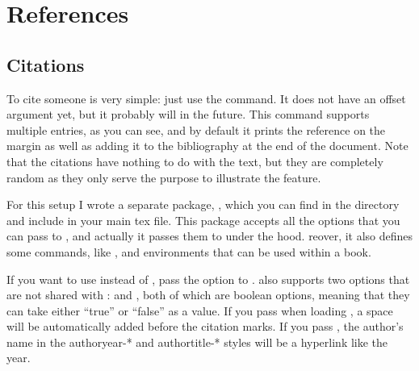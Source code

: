 \chapter{References}

\section{Citations}

To cite someone  is very simple: just 
use the  command. It does 
not have an offset argument yet, but it probably will in the future. 
This command supports multiple entries, as you can see, and by default 
it prints the reference on the margin as well as adding it to the 
bibliography at the end of the document. Note that the citations have 
nothing to do with the text, but they are completely 
random as they only serve the purpose to illustrate the feature.

For this setup I wrote a separate package, , which 
you can find in the  directory and include in your main 
tex file. This package accepts all the options that you can pass to 
, and actually it passes them to  
under the hood. 
reover, it also defines some commands, like 
, and environments that can be used within a 
 book.

If you want to use  instead of ,
pass the option  to .
 also supports two options that are not shared with
:  and ,
both of which are boolean options, meaning that they can take
either \enquote{true} or \enquote{false} as a value. If you
pass  when loading ,
a space will be automatically added before the citation marks.
If you pass , the author's name in
the authoryear-* and authortitle-* styles will be a hyperlink
like the year.

